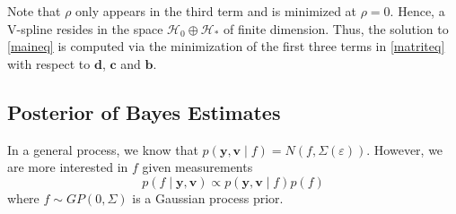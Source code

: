 Note that $\rho$ only appears in the third term and is minimized at $\rho=0$. Hence, a V-spline resides in the space $\mathcal{H}_0\oplus \mathcal{H}_*$ of finite dimension. Thus, the solution to \eqref{maineq} is computed via the minimization of the first three terms in \eqref{matriteq} with respect to $\mathbf{d}$, $\mathbf{c}$ and $\mathbf{b}$.



\subsection{Posterior of Bayes Estimates}\label{sectionBayesEstimate}




In a general process, we know that $p(\mathbf{y},\mathbf{v}\mid f) = N(f,\Sigma(\varepsilon))$. However, we are more interested in $f$ given measurements 
\begin{equation}
p(f\mid \mathbf{y},\mathbf{v}) \propto p(\mathbf{y},\mathbf{v}\mid f)p(f)
\end{equation}
where $f\sim GP(0,\Sigma)$ is a Gaussian process prior.

